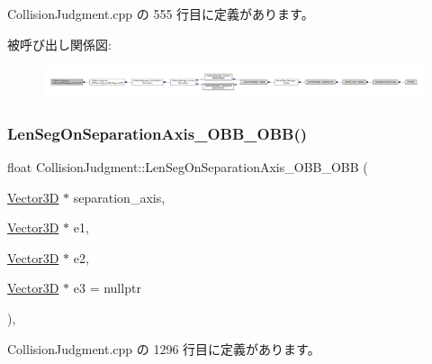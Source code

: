  Collision\+Judgment.\+cpp の 555 行目に定義があります。

被呼び出し関係図\+:
\nopagebreak
\begin{figure}[H]
\begin{center}
\leavevmode
\includegraphics[width=350pt]{class_collision_judgment_ab2e5a2c714c8c7c7f26ef9b025b57d01_icgraph}
\end{center}
\end{figure}
\mbox{\label{class_collision_judgment_ac9e908375427b6b00bd82e2f5a5b034a}} 
\subsubsection{\texorpdfstring{Len\+Seg\+On\+Separation\+Axis\+\_\+\+O\+B\+B\+\_\+\+O\+B\+B()}{LenSegOnSeparationAxis\_OBB\_OBB()}}
{\footnotesize\ttfamily float Collision\+Judgment\+::\+Len\+Seg\+On\+Separation\+Axis\+\_\+\+O\+B\+B\+\_\+\+O\+BB (\begin{DoxyParamCaption}\item[{\mbox{\hyperlink{class_vector3_d}{Vector3D}} $\ast$}]{separation\+\_\+axis,  }\item[{\mbox{\hyperlink{class_vector3_d}{Vector3D}} $\ast$}]{e1,  }\item[{\mbox{\hyperlink{class_vector3_d}{Vector3D}} $\ast$}]{e2,  }\item[{\mbox{\hyperlink{class_vector3_d}{Vector3D}} $\ast$}]{e3 = {\ttfamily nullptr} }\end{DoxyParamCaption})\hspace{0.3cm}{\ttfamily [static]}, {\ttfamily [private]}}



 Collision\+Judgment.\+cpp の 1296 行目に定義があります。

